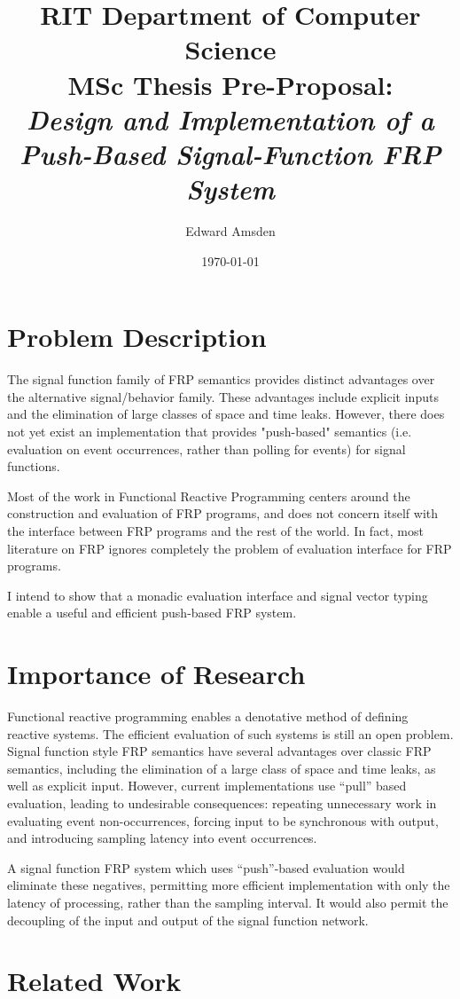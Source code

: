 \documentclass[11pt]{artikel3}
\title{RIT Department of Computer Science\\MSc Thesis Pre-Proposal:\\\emph{Design and Implementation of a Push-Based Signal-Function FRP System}}
\author{Edward Amsden}
\date{\today}
\begin{document}
\maketitle

\section{Problem Description}
The signal function family of FRP semantics provides distinct advantages over the alternative signal/behavior family. These advantages include explicit inputs and the elimination of large classes of space and time leaks. However, there does not yet exist an implementation that provides "push-based" semantics (i.e. evaluation on event occurrences, rather than polling for events) for signal functions. 

Most of the work in Functional Reactive Programming centers around the construction and evaluation of FRP programs, and does not concern itself with the interface between FRP programs and the rest of the world. In fact, most literature on FRP ignores completely the problem of evaluation interface for FRP programs. 

I intend to show that a monadic evaluation interface and signal vector typing enable a useful and efficient push-based FRP system.

\section{Importance of Research}
Functional reactive programming enables a denotative method of defining reactive systems. The efficient evaluation
of such systems is still an open problem. Signal function style FRP semantics have several advantages over
classic FRP semantics, including the elimination of a large class of space and time leaks, as well as explicit input. However,
current implementations use ``pull'' based evaluation, leading to undesirable consequences:
repeating unnecessary work in evaluating event non-occurrences, forcing input to be synchronous with output, and introducing sampling latency into event occurrences.

A signal function FRP system which uses ``push''-based evaluation would eliminate these negatives, permitting more
efficient implementation with only the latency of processing, rather than the sampling interval. It would also permit
the decoupling of the input and output of the signal function network.

\section{Related Work}
\end{document}
